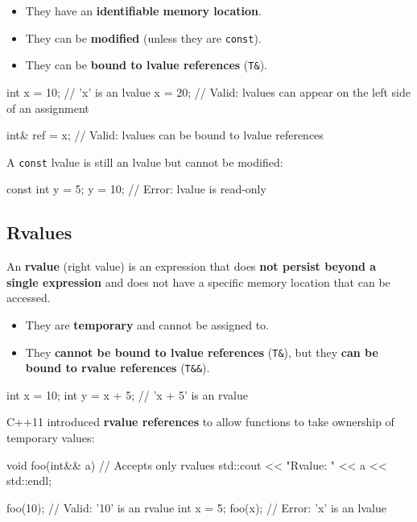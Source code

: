 \begin{itemize}
    \item They have an \textbf{identifiable memory location}.
    \item They can be \textbf{modified} (unless they are \texttt{const}).
    \item They can be \textbf{bound to lvalue references} (\texttt{T\&}).
\end{itemize}

\begin{exampleblock}
\begin{codeblock}[language=C++]
int x = 10;  // 'x' is an lvalue
x = 20;      // Valid: lvalues can appear on the left side of an assignment

int& ref = x;  // Valid: lvalues can be bound to lvalue references
\end{codeblock}
\end{exampleblock}

A \texttt{const} lvalue is still an lvalue but cannot be modified:
\begin{codeblock}[language=C++]
const int y = 5;
y = 10;  // Error: lvalue is read-only
\end{codeblock}

\subsection*{Rvalues}
\begin{definitionblock}
    An \textbf{rvalue} (right value) is an expression that does \textbf{not persist beyond a single expression} and does not have a specific memory location that can be accessed.
\end{definitionblock}

\begin{itemize}
    \item They are \textbf{temporary} and cannot be assigned to.
    \item They \textbf{cannot be bound to lvalue references} (\texttt{T\&}), but they \textbf{can be bound to rvalue references} (\texttt{T\&\&}).
\end{itemize}

\begin{exampleblock}
\begin{codeblock}[language=C++]
int x = 10;
int y = x + 5;  // 'x + 5' is an rvalue
\end{codeblock}
\end{exampleblock}

C++11 introduced \textbf{rvalue references} to allow functions to take ownership of temporary values:
\begin{codeblock}[language=C++]
void foo(int&& a) {  // Accepts only rvalues
    std::cout << "Rvalue: " << a << std::endl;
}

foo(10);  // Valid: '10' is an rvalue
int x = 5;
foo(x);   // Error: 'x' is an lvalue
\end{codeblock}

